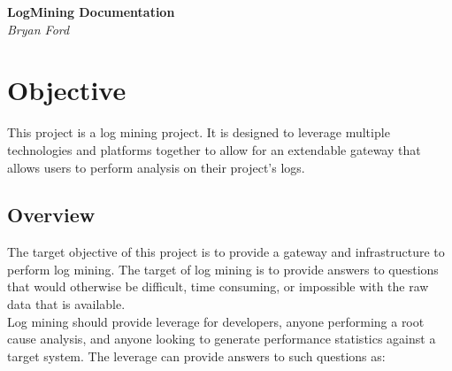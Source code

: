 \documentclass{article}
\begin{document}
	
\begin{titlepage}
		\begin{center}
		\Large\textbf{LogMining Documentation}\\
		\large\textit{Bryan Ford}
		\end{center}
\tableofcontents
\end{titlepage}

\newpage

\section{Objective}

This project is a log mining project. It is designed to leverage multiple technologies and platforms together to allow for an extendable gateway that allows users to perform analysis on their project's logs.

\subsection{Overview}

The target objective of this project is to provide a gateway and infrastructure to perform log mining. The target of log mining is to provide answers to questions that would otherwise be difficult, time consuming, or impossible with the raw data that is available.\\

\noindent Log mining should provide leverage for developers, anyone performing a root cause analysis, and anyone looking to generate performance statistics against a target system. The leverage can provide answers to such questions as:
\end{document}

